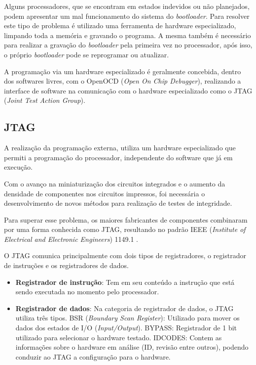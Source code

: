 


Alguns processadores, que se encontram em estados indevidos ou não planejados, podem apresentar um mal funcionamento do sistema do \textit{bootloader}. Para resolver este tipo de problema é utilizado uma ferramenta de hardware especializado, limpando toda a memória e gravando o programa. A mesma também é necessário para realizar a gravação do \textit{bootloader} pela primeira vez no processador, após isso, o próprio \textit{bootloader} pode se reprogramar ou atualizar.

A programação via um hardware especializado é geralmente concebida, dentro dos softwares livres, com o OpenOCD (\textit{Open On Chip Debugger})\cite{openocd}, realizando a interface de software na comunicação com o hardware especializado como o JTAG (\textit{Joint Test Action Group}).


\subsection{JTAG}
A realização da programação externa, utiliza um hardware especializado que permiti a programação do processador, independente do software que já em execução.

Com o avanço na miniaturização dos circuitos integrados e o aumento da densidade de componentes nos circuitos impressos, foi necessária o desenvolvimento de novos métodos para realização de testes de integridade.

Para superar esse problema, os maiores fabricantes de componentes combinaram por uma forma conhecida como JTAG, resultando no padrão IEEE (\textit{Institute of Electrical and Electronic Engineers}) 1149.1 \cite{jtagcite}.

O JTAG comunica principalmente com dois tipos de registradores, o registrador de instruções e os registradores de dados.

\begin{itemize}
\item \textbf{Registrador de instrução}: Tem em seu conteúdo a instrução que está sendo executada no momento pelo processador.
\item \textbf{Registrador de dados}: Na categoria de registrador de dados, o JTAG utiliza três tipos.
\subitem BSR (\textit{Boundary Scan Register}): Utilizado para mover os dados dos estados de I/O (\textit{Input/Output}).
\subitem BYPASS: Registrador de 1 bit utilizado para selecionar o hardware testado.
\subitem IDCODES: Contem as informações sobre o hardware em análise (ID, revisão entre outros), podendo conduzir ao JTAG a configuração para o hardware.
\end{itemize}

